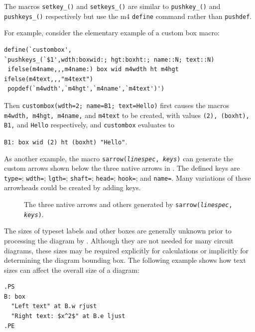 The macros {\tt setkey\_()} and {\tt setkeys\_()} are similar to
{\tt pushkey\_()} and {\tt pushkeys\_()} respectively but use the
m4 {\tt define} command rather than {\tt pushdef}.

For example, consider the elementary example of a custom box macro:

\begin{verbatim}
define(`custombox',
`pushkeys_(`$1',wdth:boxwid:; hgt:boxht:; name::N; text::N)
 ifelse(m4name,,,m4name:) box wid m4wdth ht m4hgt ifelse(m4text,,,"m4text")
 popdef(`m4wdth',`m4hgt',`m4name',`m4text')')
\end{verbatim}

Then {\tt custombox(wdth=2; name=B1; text=Hello)}
first causes the macros {\tt m4wdth, m4hgt, m4name,} and {\tt m4text}
to be created, with values {\tt (2), (boxht), B1,} and {\tt Hello}
respectively, and {\tt custombox} evaluates to

{\tt B1:\ box wid (2) ht (boxht) "Hello"}.


As another example, the macro
{\tt sarrow({\sl linespec}, {\sl keys})}
can generate the custom arrows shown below the three native arrows
in .  The defined keys are
 {\tt type=}; {\tt wdth=}; {\tt lgth=};
 {\tt shaft=}; {\tt head=}; {\tt hook=}; and {\tt name=}. 
Many variations of these arrowheads could be created by adding keys.
\begin{figure}[H]
   
   \caption{The three \dpic native arrows and others generated by
    {\tt sarrow({\sl linespec}, {\sl keys})}.}
   \label{arrowex}
   \end{figure}


\enlargethispage{\baselineskip}
The sizes of typeset labels and other \tex boxes are generally unknown
prior to processing the diagram by \latex.
Although they are not needed for many circuit diagrams,
these sizes may be required explicitly for calculations or implicitly
for determining the diagram bounding box.  
The following example shows how text sizes can affect the overall size of
a diagram:

\begin{verbatim}
.PS
B: box
  "Left text" at B.w rjust
  "Right text: $x^2$" at B.e ljust
.PE
\end{verbatim}


